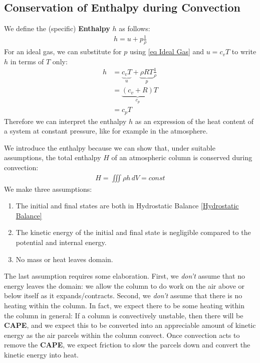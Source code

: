 \subsection{Conservation of Enthalpy during Convection}

We define the (specific) \textbf{Enthalpy} \(h\) as follows:
\begin{align}
    h=u+p\frac{1}{\rho}
\end{align}
For an ideal gas, we can substitute for \(p\) using \ref{eq Ideal Gas} and \(u=c_vT\) to write \(h\) in terms of \(T\) only:
\begin{align*}
    h&=\underbrace{c_vT}_{u}+\underbrace{\rho R T}_{p}\frac{1}{\rho}\\
    &=\underbrace{(c_v+R)}_{c_p}T\\
    &=c_pT
\end{align*}
Therefore we can interpret the enthalpy \(h\) as an expression of the heat content of a system at constant pressure, like for example in the atmosphere.

We introduce the enthalpy because we can show that, under suitable assumptions, the total enthalpy \(H\) of an atmospheric column is conserved during convection:
\begin{align*}
    H=\iiint \rho h\,dV=const
\end{align*}
We make three assumptions:
\begin{enumerate}
    \item The initial and final states are both in Hydrostatic Balance \ref{Hydrostatic Balance}
    \item The kinetic energy of the initial and final state is negligible compared to the potential and internal energy.
    \item No mass or heat leaves domain.
\end{enumerate}
The last assumption requires some elaboration. First, we \textit{don't} assume that no energy leaves the domain: we allow the column to do work on the air above or below itself as it expands/contracts. Second, we \textit{don't} assume that there is no heating within the column. In fact, we expect there to be some heating within the column in general: If a column is convectively unstable, then there will be \textbf{CAPE}, and we expect this to be converted into an appreciable amount of kinetic energy as the air parcels within the column convect. Once convection acts to remove the \textbf{CAPE}, we expect friction to slow the parcels down and convert the kinetic energy into heat. 

